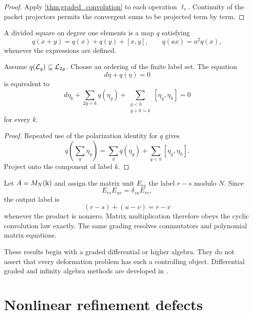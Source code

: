 \begin{proof}
Apply \cref{thm:graded_convolution} to each operation $\ell_r$.  Continuity of the packet projectors permits the convergent sums to be projected term by term.
\end{proof}

\begin{definition}\label{def:divided_square}
A divided square on degree one elements is a map $q$ satisfying
\[
q(x+y)=q(x)+q(y)+[x,y],
\qquad
q(ax)=a^2q(x),
\]
whenever the expressions are defined.
\end{definition}

\begin{proposition}\label{prop:divided_square_packets}
Assume $q(\mathcal L_g)\subseteq\mathcal L_{2g}$.  Choose an ordering of the finite label set.  The equation
\[
d\eta+q(\eta)=0
\]
is equivalent to
\[
d\eta_k
+
\sum_{2g=k}q(\eta_g)
+
\sum_{\substack{g<h\\g+h=k}}[\eta_g,\eta_h]
=0
\]
for every $k$.
\end{proposition}

\begin{proof}
Repeated use of the polarization identity for $q$ gives
\[
q\left(\sum_g\eta_g\right)
=
\sum_gq(\eta_g)
+
\sum_{g<h}[\eta_g,\eta_h].
\]
Project onto the component of label $k$.
\end{proof}


\begin{example}\label{ex:matrix_difference_grading}
Let $A=M_N(\Bbbk)$ and assign the matrix unit $E_{rs}$ the label $r-s$ modulo $N$.  Since
\[
E_{rs}E_{uv}=\delta_{su}E_{rv},
\]
the output label is
\[
(r-s)+(u-v)=r-v
\]
whenever the product is nonzero.  Matrix multiplication therefore obeys the cyclic convolution law exactly.  The same grading resolves commutators and polynomial matrix equations.
\end{example}

\begin{remark}\label{rem:graded_boundary}
These results begin with a graded differential or higher algebra.  They do not assert that every deformation problem has such a controlling object.  Differential graded and infinity algebra methods are developed in \cite{LodayVallette2012}.
\end{remark}

\section{Nonlinear refinement defects}\label{sec:nonlinear_defects}

